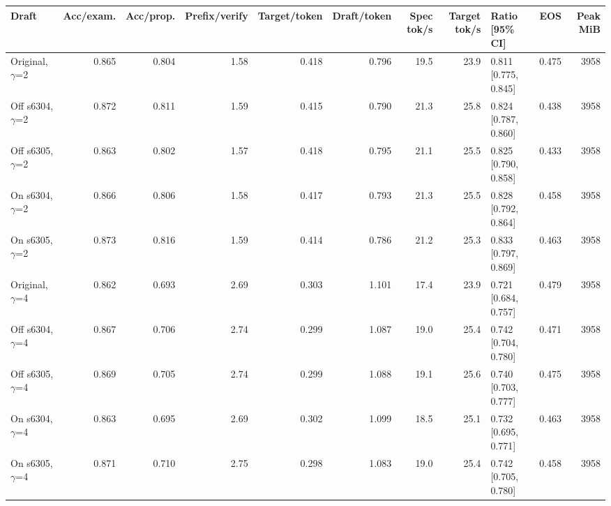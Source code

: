 \scriptsize
\setlength{\tabcolsep}{3.5pt}
\label{tab:t3speed}
\begin{adjustbox}{max width=\linewidth}
\begin{tabular}{lrrrrrrrlrr}
\toprule
Draft & Acc/exam. & Acc/prop. & Prefix/verify & Target/token & Draft/token & Spec tok/s & Target tok/s & Ratio [95\% CI] & EOS & Peak MiB \\
\midrule
Original, $\gamma$=2 & 0.865 & 0.804 & 1.58 & 0.418 & 0.796 & 19.5 & 23.9 & 0.811 [0.775, 0.845] & 0.475 & 3958 \\
Off s6304, $\gamma$=2 & 0.872 & 0.811 & 1.59 & 0.415 & 0.790 & 21.3 & 25.8 & 0.824 [0.787, 0.860] & 0.438 & 3958 \\
Off s6305, $\gamma$=2 & 0.863 & 0.802 & 1.57 & 0.418 & 0.795 & 21.1 & 25.5 & 0.825 [0.790, 0.858] & 0.433 & 3958 \\
On s6304, $\gamma$=2 & 0.866 & 0.806 & 1.58 & 0.417 & 0.793 & 21.3 & 25.5 & 0.828 [0.792, 0.864] & 0.458 & 3958 \\
On s6305, $\gamma$=2 & 0.873 & 0.816 & 1.59 & 0.414 & 0.786 & 21.2 & 25.3 & 0.833 [0.797, 0.869] & 0.463 & 3958 \\
\midrule
Original, $\gamma$=4 & 0.862 & 0.693 & 2.69 & 0.303 & 1.101 & 17.4 & 23.9 & 0.721 [0.684, 0.757] & 0.479 & 3958 \\
Off s6304, $\gamma$=4 & 0.867 & 0.706 & 2.74 & 0.299 & 1.087 & 19.0 & 25.4 & 0.742 [0.704, 0.780] & 0.471 & 3958 \\
Off s6305, $\gamma$=4 & 0.869 & 0.705 & 2.74 & 0.299 & 1.088 & 19.1 & 25.6 & 0.740 [0.703, 0.777] & 0.475 & 3958 \\
On s6304, $\gamma$=4 & 0.863 & 0.695 & 2.69 & 0.302 & 1.099 & 18.5 & 25.1 & 0.732 [0.695, 0.771] & 0.463 & 3958 \\
On s6305, $\gamma$=4 & 0.871 & 0.710 & 2.75 & 0.298 & 1.083 & 19.0 & 25.4 & 0.742 [0.705, 0.780] & 0.458 & 3958 \\
\bottomrule
\end{tabular}
\end{adjustbox}
